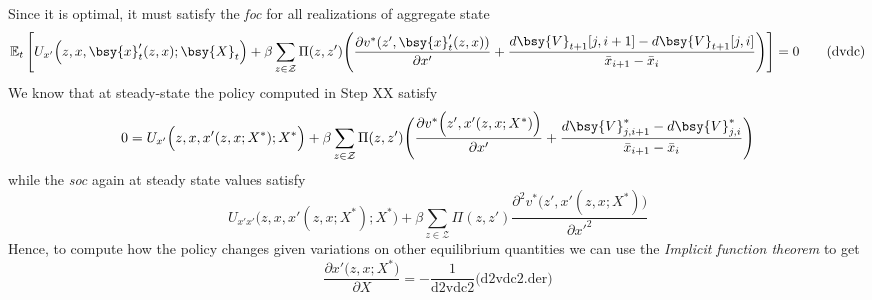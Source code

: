 \documentclass[a4paper,10pt]{article}  %
\begin{document}
Since it is optimal, it must satisfy the \emph{foc} for all realizations of aggregate state
\begin{equation}
   \label{eq:foc}
   \mathbb{E}_t 
   \left[
   U_{x'} \Big( z, x, \bsy{x}_t'(z,x); \bsy{X}_t \Big) + \beta
      \sum_{z \in \mathcal{Z} }  \Pi(z,z')
      \Bigg( 
         \frac{ \partial v^*(z', \bsy{x}_t'(z,x) ) }{ \partial x' } + 
         \frac{ d \bsy{V}_{t+1}[j,i+1 ] - d \bsy{V}_{t+1}[j,i] }{ \bar{x}_{i+1} - \bar{x}_{i} }
       \Bigg)
   \right] = 0
   \tag{dvdc}
\end{equation}
We know that at steady-state the policy computed in Step XX satisfy
\begin{equation*}
   \label{eq:focstst}
   0 = U_{x'} \Big( z, x, x'(z,x; X^*); X^* \Big) + \beta 
      \sum_{z \in \mathcal{Z} }  \Pi(z,z')
      \Bigg( 
         \frac{ \partial v^* \Big(z', x'(z,x; X^*) \Big) }{ \partial x' } +
         \frac{ d \bsy{V}^*_{j,i+1} - d \bsy{V}^*_{j,i} }{ \bar{x}_{i+1} - \bar{x}_{i} }
       \Bigg)
\end{equation*}
while the \emph{soc} again at steady state values satisfy
\begin{equation}
   \label{eq:soc}
   U_{x'x'} \Big( z,x, x'(z,x; X^*) ; X^* \Big) + \beta 
         \sum_{z \in \mathcal{Z} }  \Pi(z,z')
         \frac{ \partial^2 v^*\Big( z', x'(z,x; X^*) \Big)}{ \partial {x'}^2}
   \tag{d2vdc2}
\end{equation}
Hence, to compute how the policy changes given variations on other equilibrium quantities we can use
the \emph{Implicit function theorem} to get
\begin{equation}
   \label{eq:}
   \frac{ \partial x' \Big( z,x ; X^* \Big) }{ \partial X }  = - \frac{1}{ \text{d2vdc2} } \Big( \text{d2vdc2.der} \Big)
\end{equation}



\end{document}
